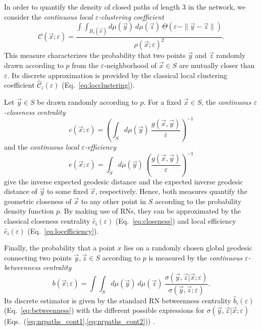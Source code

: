 		In order to quantify the density of closed paths of length 3 in the network, we consider the \emph{continuous local $\varepsilon$-clustering coefficient}
\begin{equation}
\mathcal{C}(\vec{x};\varepsilon)=\frac{\int\int_{B_{\varepsilon}(\vec{x})} d\mu(\vec{y})\ d\mu(\vec{z})\ \Theta(\varepsilon-\|\vec{y}-\vec{z}\|)}{\rho(\vec{x};\varepsilon)^2}.
\end{equation}
\noindent
This measure characterizes the probability that two points $\vec{y}$ and $\vec{z}$ randomly drawn according to $p$ from the $\varepsilon$-neighborhood of $\vec{x}\in S$ are mutually closer than $\varepsilon$. Its discrete approximation is provided by the classical local clustering coefficient $\hat{\mathcal{C}}_i(\varepsilon)$ (Eq.~\ref{eq:locclustering}).

		Let $\vec{y}\in S$ be drawn randomly according to $p$. For a fixed $\vec{x}\in S$, the \emph{continuous $\varepsilon$-closeness centrality}
\begin{equation}
c(\vec{x};\varepsilon)=\left(\int_S d\mu(\vec{y})\ \frac{g(\vec{x},\vec{y})}{\varepsilon}\right)^{-1}
\end{equation}
\noindent
and the \emph{continuous local $\varepsilon$-efficiency}
\begin{equation}
e(\vec{x};\varepsilon)=\int_S d\mu(\vec{y})\ \left(\frac{g(\vec{x},\vec{y})}{\varepsilon}\right)^{-1}
\end{equation}
\noindent
give the inverse expected geodesic distance and the expected inverse geodesic distance of $\vec{y}$ to some fixed $\vec{x}$, respectively. Hence, both measures quantify the geometric closeness of $\vec{x}$ to any other point in $S$ according to the probability density function $p$. By making use of RNs, they can be approximated by the classical closeness centrality $\hat{c}_i(\varepsilon)$ (Eq.~\ref{eq:closeness}) and local efficiency $\hat{e}_i(\varepsilon)$ (Eq.~\ref{eq:locefficiency}).

		Finally, the probability that a point $x$ lies on a randomly chosen global geodesic connecting two points $\vec{y},\vec{z}\in S$ according to $p$ is measured by the \emph{continuous $\varepsilon$-betweenness centrality}
\begin{equation}
b(\vec{x};\varepsilon)=\int\int_S d\mu(\vec{y})\ d\mu(\vec{z})\ \frac{\sigma(\vec{y},\vec{z}|\vec{x};\varepsilon)}{\sigma(\vec{y},\vec{z};\varepsilon)}.
\end{equation}
\noindent
Its discrete estimator is given by the standard RN betweenness centrality $\hat{b}_i(\varepsilon)$ (Eq.~\ref{eq:betweenness}) with the different possible expressions for $\sigma(\vec{y},\vec{z}|\vec{x};\varepsilon)$ (Eqs.~(\ref{eq:nrpaths_cont1},\ref{eq:nrpaths_cont2})) \cite{Donges2012}.



